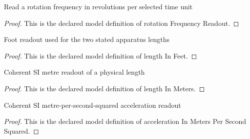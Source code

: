 \begin{definition}
  \label{def:physics:phyx-mini-0687:phyxminiproblems-problemphyxmini0687-rotationfrequencyreadout}
  Read a rotation frequency in revolutions per selected time unit
\end{definition}
\begin{proof}
  This is the declared model definition of rotation Frequency Readout.
\end{proof}
\begin{definition}
  \label{def:physics:phyx-mini-0687:phyxminiproblems-problemphyxmini0687-lengthinfeet}
  Foot readout used for the two stated apparatus lengths
\end{definition}
\begin{proof}
  This is the declared model definition of length In Feet.
\end{proof}
\begin{definition}
  \label{def:physics:phyx-mini-0687:phyxminiproblems-problemphyxmini0687-lengthinmeters}
  Coherent SI metre readout of a physical length
\end{definition}
\begin{proof}
  This is the declared model definition of length In Meters.
\end{proof}
\begin{definition}
  \label{def:physics:phyx-mini-0687:phyxminiproblems-problemphyxmini0687-accelerationinmeterspersecondsquared}
  Coherent SI metre-per-second-squared acceleration readout
\end{definition}
\begin{proof}
  This is the declared model definition of acceleration In Meters Per Second Squared.
\end{proof}
